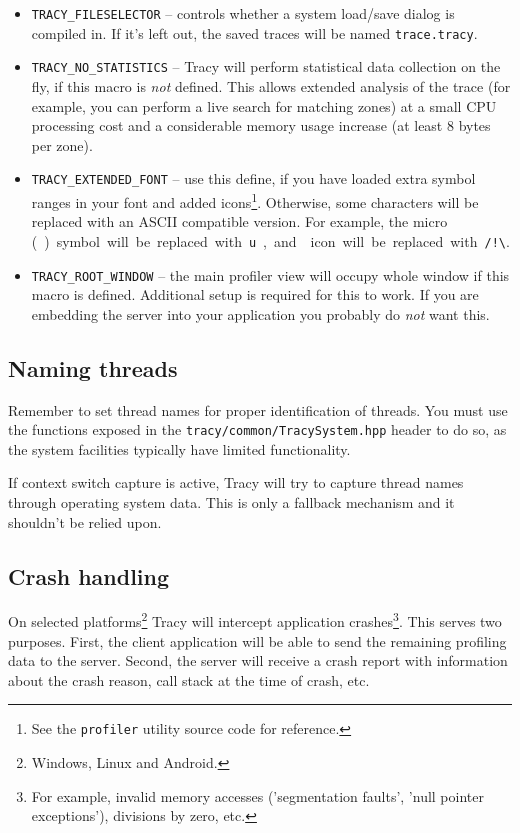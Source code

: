\documentclass[hidelinks,titlepage,a4paper]{article}
\begin{document}
\begin{itemize}
\item \texttt{TRACY\_FILESELECTOR} -- controls whether a system load/save dialog is compiled in. If it's left out, the saved traces will be named \texttt{trace.tracy}.
\item \texttt{TRACY\_NO\_STATISTICS} -- Tracy will perform statistical data collection on the fly, if this macro is \emph{not} defined. This allows extended analysis of the trace (for example, you can perform a live search for matching zones) at a small CPU processing cost and a considerable memory usage increase (at least 8 bytes per zone).
\item \texttt{TRACY\_EXTENDED\_FONT} -- use this define, if you have loaded extra symbol ranges in your font and added icons\footnote{See the \texttt{profiler} utility source code for reference.}. Otherwise, some characters will be replaced with an ASCII compatible version. For example, the micro (\si\micro) symbol will be replaced with \texttt{u}, and \faExclamationTriangle{} icon will be replaced with \texttt{/!\textbackslash}.
\item \texttt{TRACY\_ROOT\_WINDOW} -- the main profiler view will occupy whole window if this macro is defined. Additional setup is required for this to work. If you are embedding the server into your application you probably do \emph{not} want this.
\end{itemize}

\subsection{Naming threads}

Remember to set thread names for proper identification of threads. You must use the functions exposed in the \texttt{tracy/common/TracySystem.hpp} header to do so, as the system facilities typically have limited functionality.

If context switch capture is active, Tracy will try to capture thread names through operating system data. This is only a fallback mechanism and it shouldn't be relied upon.

\subsection{Crash handling}
\label{crashhandling}

On selected platforms\footnote{Windows, Linux and Android.} Tracy will intercept application crashes\footnote{For example, invalid memory accesses ('segmentation faults', 'null pointer exceptions'), divisions by zero, etc.}. This serves two purposes. First, the client application will be able to send the remaining profiling data to the server. Second, the server will receive a crash report with information about the crash reason, call stack at the time of crash, etc.
\end{document}
